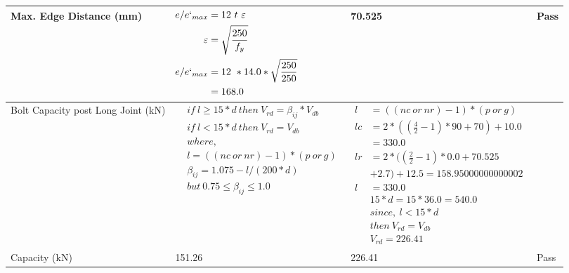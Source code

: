 \documentclass{article}%
\begin{document}
\begin{longtable}{|p{4cm}|p{5cm}|p{5.5cm}|p{1.5cm}|}
\hline%
Max. Edge Distance (mm)&$\begin{aligned}e/e`_{max} &= 12~ t~ \varepsilon&\\ \varepsilon &= \sqrt{\frac{250}{f_y}}\\ e/e`_{max}&=12 ~*14.0*\sqrt{\frac{250}{250}}\\ &=168.0\\ \end{aligned}$&70.525&Pass\\%
\hline%
Bolt Capacity post Long Joint (kN)&$\begin{aligned} &if~l\geq 15 * d~then~V_{rd} = \beta_{ij} * V_{db} \\ & if~l < 15 * d~then~V_{rd} = V_{db} \\ & where,\\ & l = ((nc~or~nr) - 1) * (p~or~g) \\ & \beta_{ij} = 1.075 - l/(200 * d) \\ & but~0.75\leq\beta_{ij}\leq1.0 \end{aligned}$&$\begin{aligned} l~&= ((nc~or~nr) - 1) * (p~or~g) \\  lc&= 2*((\frac{4}{2} - 1) * 90+70)+ 10.0\\&=330.0\\  lr&= 2*((\frac{2}{2} - 1) * 0.0+70.525\\& +2.7)+ 12.5=158.95000000000002\\  l~&= 330.0\\ & 15 * d = 15 * 36.0 = 540.0 \\ & since,~l < 15 * d~ \\& then~V_{rd} = V_{db} \\ & V_{rd} = 226.41 \end{aligned}$&\\%
\hline%
Capacity (kN)&151.26&226.41&Pass\\%
\hline%
\end{longtable}

%
\newpage%
\end{document}
